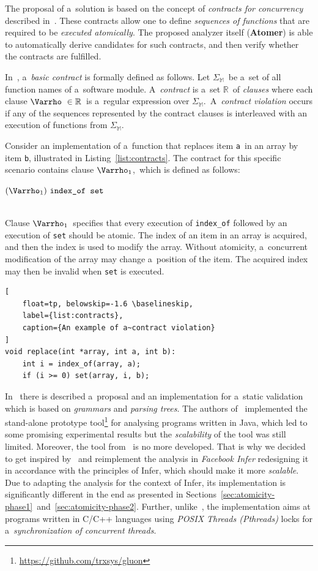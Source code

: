 \documentclass{ExcelAtFIT}
\begin{document}
The proposal of a~solution is based on the concept of
\emph{contracts for concurrency} described
in~\cite{atomicity-contracts}. These contracts
allow one to define \emph{sequences of functions} that are
required to be \emph{executed atomically}. The proposed
analyzer itself (\textbf{Atomer}) is able to automatically
derive candidates for such contracts, and then verify
whether the contracts are fulfilled.

In~\cite{atomicity-contracts},
a~\emph{basic contract} is formally defined as follows.
Let $ \Sigma_\mathbb{M} $~be a~set of all function names
of a~software module. A~\emph{contract} is
a~set $ \mathbb{R} $~of \emph{clauses} where each
clause $ \Varrho\ \in \mathbb{R} $~is a~regular
expression over $ \Sigma_\mathbb{M} $.~A~\emph{contract
violation} occurs if any of the sequences represented by
the contract clauses is interleaved with an execution of
functions from $ \Sigma_\mathbb{M} $.

Consider an implementation of a~function that replaces
item \texttt{a}~in an array by item \texttt{b},
illustrated in Listing~\ref{list:contracts}. The contract
for this specific scenario contains
clause $ \Varrho_1 $,~which is defined as follows:
\\[0.4em]
\centerline{$ 
    (\Varrho_1)\ \text{\texttt{index\_of~set}} 
$}
\\[0.4em]
Clause $ \Varrho_1 $~specifies that every execution
of \texttt{index\_of} followed by an execution of
\texttt{set} should be atomic. The index of an
item in an array is acquired, and then the index
is used to modify the array. Without atomicity,
a~concurrent modification of the array may change
a~position of the item. The acquired index may
then be invalid when \texttt{set} is executed.

\begin{lstlisting}[
    float=tp, belowskip=-1.6 \baselineskip,
    label={list:contracts},
    caption={An example of a~contract violation}
]
void replace(int *array, int a, int b):
    int i = index_of(array, a);
    if (i >= 0) set(array, i, b);
\end{lstlisting}

In~\cite{atomicity-contracts} there is described
a~proposal and an implementation for a~static
validation which is based on \emph{grammars} and
\emph{parsing trees}. The authors
of~\cite{atomicity-contracts} implemented
the stand-alone prototype
tool\footnote{\url{https://github.com/trxsys/gluon}} for
analysing programs written in Java, which
led to some promising experimental results but the
\emph{scalability} of the tool was still limited. Moreover,
the tool from~\cite{atomicity-contracts} is no more
developed. That is why we decided to get inspired
by~\cite{atomicity-contracts} and reimplement the
analysis in \emph{Facebook Infer} redesigning it in
accordance with the principles of Infer, which
should make it more \emph{scalable}. Due to adapting the
analysis for the context of Infer, its
implementation is significantly different in the
end as presented in
Sections~\ref{sec:atomicity-phase1}~and~\ref{sec:atomicity-phase2}.
Further, unlike~\cite{atomicity-contracts},
the implementation aims at programs written in
C/C++ languages using \emph{POSIX Threads (Pthreads)}
locks for a~\emph{synchronization of concurrent
threads}.
\end{document}
